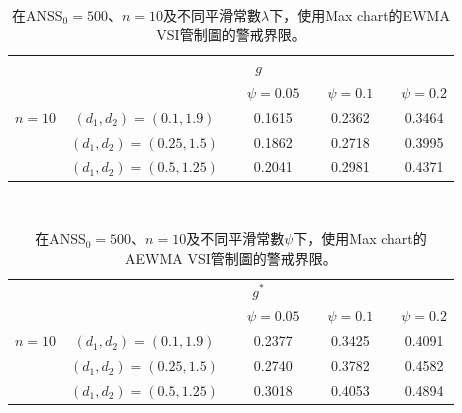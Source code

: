 \documentclass[12pt]{article}  %
\theoremstyle{plain}
\begin{document}
\begin{table}[htbp]
\centering
\caption{在ANSS$_0=500$、$n=10$及不同平滑常數$\lambda$下，使用Max chart的EWMA VSI管制圖的警戒界限。}\label{CL}
\ \\
\begin{tabular}{cccccccc}    
 \hline 
                        & \multicolumn{7}{c}{$g$}                                                    \\ \cline{2-8} 
                        &                &  & $\psi=0.05$   &  & $\psi=0.1$    &  & $\psi=0.2$    \\ \cline{4-4} \cline{6-6} \cline{8-8} 
\multirow{3}{*}{$n=10$}  & $(d_1,d_2)=(0.1,1.9)$  &  & 0.1615 &  & 0.2362 &  & 0.3464 \\
                        & $(d_1,d_2)=(0.25,1.5)$ &  & 0.1862 & & 0.2718 &  & 0.3995 \\
                        & $(d_1,d_2)=(0.5,1.25)$ &  & 0.2041 &  & 0.2981 &  & 0.4371 \\ \hline  

\end{tabular}
\end{table}

\begin{table}[htbp]
\centering
\caption{在ANSS$_0=500$、$n=10$及不同平滑常數$\psi$下，使用Max chart的AEWMA VSI管制圖的警戒界限。}\label{CL}
\ \\
\begin{tabular}{cccccccc}    
 \hline 
                        & \multicolumn{7}{c}{$g^*$}                                                    \\ \cline{2-8} 
                        &                &  & $\psi=0.05$   &  & $\psi=0.1$    &  & $\psi=0.2$    \\ \cline{4-4} \cline{6-6} \cline{8-8} 
\multirow{3}{*}{$n=10$}  & $(d_1,d_2)=(0.1,1.9)$  &  & 0.2377 &  & 0.3425 &  & 0.4091 \\
                        & $(d_1,d_2)=(0.25,1.5)$ &  & 0.2740 & & 0.3782 &  & 0.4582 \\
                        & $(d_1,d_2)=(0.5,1.25)$ &  & 0.3018 &  & 0.4053 &  & 0.4894 \\ \hline  

\end{tabular}
\end{table}
\newpage
\end{document}
